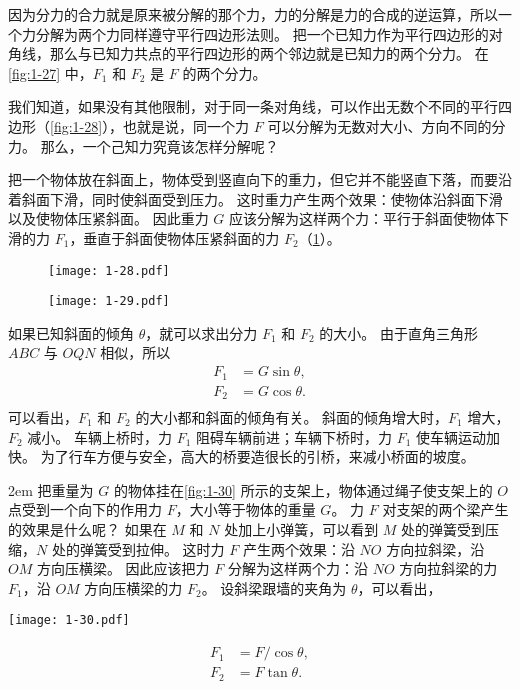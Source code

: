 因为分力的合力就是原来被分解的那个力，力的分解是力的合成的逆运算，所以一个力分解为两个力同样遵守平行四边形法则。
把一个已知力作为平行四边形的对角线，那么与已知力共点的平行四边形的两个邻边就是已知力的两个分力。
在\cref{fig:1-27} 中，$F_1$ 和 $F_2$ 是 $F$ 的两个分力。


我们知道，如果没有其他限制，对于同一条对角线，可以作出无数个不同的平行四边形（\cref{fig:1-28}），也就是说，同一个力 $F$ 可以分解为无数对大小、方向不同的分力。
那么，一个己知力究竟该怎样分解呢？

把一个物体放在斜面上，物体受到竖直向下的重力，但它并不能竖直下落，而要沿着斜面下滑，同时使斜面受到压力。
这时重力产生两个效果：使物体沿斜面下滑以及使物体压紧斜面。
因此重力 $G$ 应该分解为这样两个力：平行于斜面使物体下滑的力 $F_1$，垂直于斜面使物体压紧斜面的力 $F_2$（\cref{fig:1-29}）。

\begin{figure}
  \begin{minipage}[b]{0.48\linewidth}
    \centering
    \texttt{[image: 1-28.pdf]}
    \caption{}\label{fig:1-28}
  \end{minipage}
  \begin{minipage}[b]{0.48\linewidth}
    \centering
    \texttt{[image: 1-29.pdf]}
    \caption{}\label{fig:1-29}
  \end{minipage}
\end{figure}

如果已知斜面的倾角 $\theta$，就可以求出分力 $F_1$ 和 $F_2$ 的大小。
由于直角三角形 $ABC$ 与 $OQN$ 相似，所以
\[\begin{split}
F_1&= G\sin\theta, \\
F_2&= G\cos\theta. \\
\end{split} \]
可以看出，$F_1$ 和 $F_2$ 的大小都和斜面的倾角有关。
斜面的倾角增大时，$F_1$ 增大，$F_2$ 减小。
车辆上桥时，力 $F_1$ 阻碍车辆前进；车辆下桥时，力 $F_1$ 使车辆运动加快。
为了行车方便与安全，高大的桥要造很长的引桥，来减小桥面的坡度。

\bigskip\noindent
\begin{minipage}{0.58\linewidth}\parindent2em
把重量为 $G$ 的物体挂在\cref{fig:1-30} 所示的支架上，物体通过绳子使支架上的 $O$ 点受到一个向下的作用力 $F$，大小等于物体的重量 $G$。
力 $F$ 对支架的两个梁产生的效果是什么呢？
如果在 $M$ 和 $N$ 处加上小弹簧，可以看到 $M$ 处的弹簧受到压缩，$N$
处的弹簧受到拉伸。
这时力 $F$ 产生两个效果：沿 $NO$ 方向拉斜梁，沿 $OM$ 方向压横梁。
因此应该把力 $F$ 分解为这样两个力：沿 $NO$ 方向拉斜梁的力 $F_1$，沿 $OM$ 方向压横梁的力 $F_2$。
设斜梁跟墙的夹角为 $\theta$，可以看出，
\end{minipage}\hfill
\begin{minipage}{0.4\linewidth}
  \begin{figurehere}
    \texttt{[image: 1-30.pdf]}
    \caption{}\label{fig:1-30}
  \end{figurehere}
\end{minipage}
\[\begin{split}
F_1&= F/\cos\theta, \\
F_2&= F\tan\theta. \\
\end{split} \]

